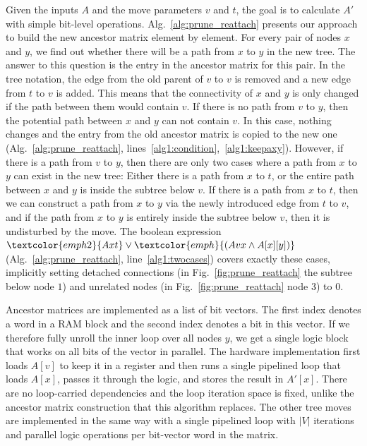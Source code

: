 Given the inputs $A$ and the move parameters $v$ and $t$, the goal is to calculate $A'$ with simple bit-level operations. Alg.~\ref{alg:prune_reattach} presents our approach to build the new ancestor matrix element by element. 
For every pair of nodes $x$ and $y$, we find out whether there will be a path from $x$ to $y$ in the new tree. The answer to this question is the entry in the ancestor matrix for this pair. 
In the tree notation, the edge from the old parent of $v$ to $v$ is removed and a new edge from $t$ to $v$ is added. This means that the connectivity of $x$ and $y$ is only changed if the path between them would contain $v$. If there is no path from $v$ to $y$, then the potential path between $x$ and $y$ can not contain $v$. In this case, nothing changes and the entry from the old ancestor matrix is copied to the new one (Alg.~\ref{alg:prune_reattach}, lines~\ref{alg1:condition},~\ref{alg1:keepaxy}).
However, if there is a path from $v$ to $y$, then there are only two cases where a path from $x$ to $y$ can exist in the new tree: Either there is a path from $x$ to $t$, or the entire path between $x$ and $y$ is inside the subtree below $v$. If there is a path from $x$ to $t$, then we can construct a path from $x$ to $y$ via the newly introduced edge from $t$ to $v$, and if the path from $x$ to $y$ is entirely inside the subtree below $v$, then it is undisturbed by the move. The boolean expression $\textcolor{emph2}{Axt} \vee \textcolor{emph}{(Avx \wedge A[x][y])}$
(Alg.~\ref{alg:prune_reattach}, line~\ref{alg1:twocases}) covers exactly these cases, implicitly setting detached connections (in Fig.~\ref{fig:prune_reattach} the subtree below node $1$) and unrelated nodes (in Fig.~\ref{fig:prune_reattach} node $3$) to $0$.

Ancestor matrices are implemented as a list of bit vectors. The first index denotes a word in a RAM block and the second index denotes a bit in this vector. If we therefore fully unroll the inner loop over all nodes $y$, we get a single logic block that works on all bits of the vector in parallel. The hardware implementation first loads $A[v]$ to keep it in a register and then runs a single pipelined loop that loads $A[x]$, passes it through the logic, and stores the result in $A'[x]$. There are no loop-carried dependencies and the loop iteration space is fixed, unlike the ancestor matrix construction that this algorithm replaces. The other tree moves are implemented in the same way with a single pipelined loop with $|V|$ iterations and parallel logic operations per bit-vector word in the matrix.

